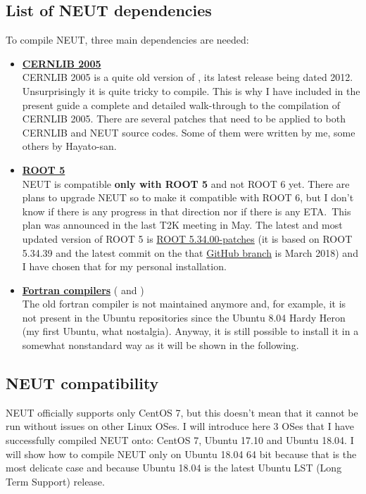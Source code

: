 \subsection{List of NEUT dependencies}\label{dep}
To compile NEUT, three main dependencies are needed:
\begin{itemize}
\item \hyperref[sec:cernlib-2005]{\textbf{CERNLIB 2005}}\\
  CERNLIB 2005 is a quite old version of , its
  latest release being dated 2012. Unsurprisingly it is quite tricky
  to compile. This is why I have included in the present guide a
  complete and detailed walk-through to the compilation of CERNLIB
  2005. There are several patches that need to be applied to both
  CERNLIB and NEUT source codes. Some of them were written by me, some
  others by Hayato-san.
\item \hyperref[root5]{\textbf{ROOT 5}}\\
  NEUT is compatible \textbf{only with ROOT 5} and not ROOT 6
  yet. There are plans to upgrade NEUT so to make it compatible with
  ROOT 6, but I don't know if there is any progress in that direction
  nor if there is any ETA.\ This plan was announced in the last T2K
  meeting in May. The latest and most updated version of ROOT 5 is
  \href{https://github.com/root-project/root/tree/v5-34-00-patches?files=1}{ROOT
    5.34.00-patches} (it is based on ROOT 5.34.39 and the latest
  commit on the that
  \href{https://github.com/root-project/root/tree/v5-34-00-patches?files=1}{GitHub
    branch} is March 2018) and I have chosen that for my personal
  installation.
\item \hyperref[compiler]{\textbf{Fortran compilers}} (
  and
  )\\
  The old fortran compiler  is not maintained anymore
  and, for example, it is not present in the Ubuntu repositories since
  the Ubuntu 8.04 Hardy Heron (my first Ubuntu, what
  nostalgia). Anyway, it is still possible to install it in a somewhat
  nonstandard way as it will be shown in the following.
\end{itemize}

\subsection{NEUT compatibility}
NEUT officially supports only CentOS 7, but this doesn't mean that it
cannot be run without issues on other Linux OSes. I will introduce
here 3 OSes that I have successfully compiled NEUT onto: CentOS 7,
Ubuntu 17.10 and Ubuntu 18.04. I will show how to compile NEUT only on
Ubuntu 18.04 64 bit because that is the most delicate case and because
Ubuntu 18.04 is the latest Ubuntu LST (Long Term Support) release.
